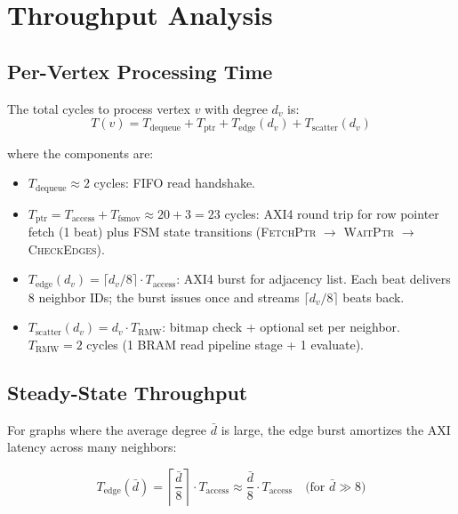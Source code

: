 \section{Throughput Analysis}
\label{sec:analysis}

\subsection{Per-Vertex Processing Time}

The total cycles to process vertex $v$ with degree $d_v$ is:
\begin{equation}
T(v) = T_\text{dequeue} + T_\text{ptr} + T_\text{edge}(d_v) + T_\text{scatter}(d_v)
\label{eq:Tv}
\end{equation}

where the components are:

\begin{itemize}[leftmargin=*,itemsep=2pt]
\item $T_\text{dequeue} \approx 2$ cycles: FIFO read handshake.
\item $T_\text{ptr} = T_\text{access} + T_\text{fsmov} \approx 20 + 3 = 23$ cycles:
  AXI4 round trip for row pointer fetch (1 beat) plus FSM state transitions
  (\textsc{FetchPtr} $\to$ \textsc{WaitPtr} $\to$ \textsc{CheckEdges}).
\item $T_\text{edge}(d_v) = \lceil d_v / 8 \rceil \cdot T_\text{access}$: AXI4 burst
  for adjacency list. Each beat delivers 8 neighbor IDs; the burst issues once and
  streams $\lceil d_v/8 \rceil$ beats back.
\item $T_\text{scatter}(d_v) = d_v \cdot T_\text{RMW}$: bitmap check + optional set
  per neighbor. $T_\text{RMW} = 2$ cycles (1 BRAM read pipeline stage + 1 evaluate).
\end{itemize}

\subsection{Steady-State Throughput}

For graphs where the average degree $\bar{d}$ is large, the edge burst amortizes
the AXI latency across many neighbors:

\begin{equation}
T_\text{edge}(\bar{d}) = \left\lceil \frac{\bar{d}}{8} \right\rceil \cdot T_\text{access}
\approx \frac{\bar{d}}{8} \cdot T_\text{access}
\quad \text{(for } \bar{d} \gg 8\text{)}
\end{equation}

